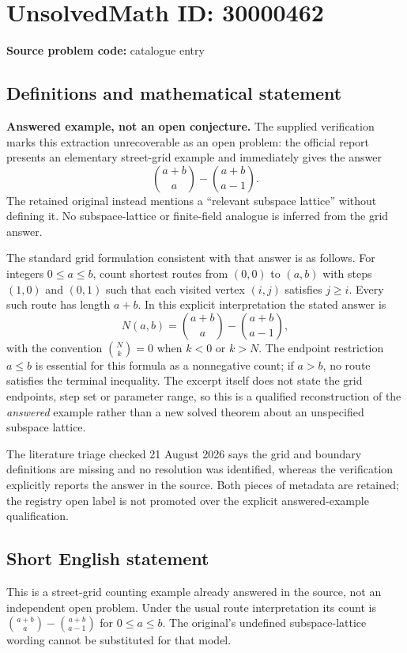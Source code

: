 \documentclass[11pt]{article}
\begin{document}
\section*{UnsolvedMath ID: 30000462}
\textbf{Source problem code:} catalogue entry
\subsection{Definitions and mathematical statement}
\textbf{Answered example, not an open conjecture.} The supplied verification marks this extraction unrecoverable as an open problem: the official report presents an elementary street-grid example and immediately gives the answer
\[
 \binom{a+b}{a}-\binom{a+b}{a-1}.
\]
The retained original instead mentions a ``relevant subspace lattice'' without defining it. No subspace-lattice or finite-field analogue is inferred from the grid answer.

The standard grid formulation consistent with that answer is as follows. For integers $0\leq a\leq b$, count shortest routes from $(0,0)$ to $(a,b)$ with steps $(1,0)$ and $(0,1)$ such that each visited vertex $(i,j)$ satisfies $j\geq i$. Every such route has length $a+b$. In this explicit interpretation the stated answer is
\[
 N(a,b)=\binom{a+b}{a}-\binom{a+b}{a-1},
\]
with the convention $\binom Nk=0$ when $k<0$ or $k>N$. The endpoint restriction $a\leq b$ is essential for this formula as a nonnegative count; if $a>b$, no route satisfies the terminal inequality. The excerpt itself does not state the grid endpoints, step set or parameter range, so this is a qualified reconstruction of the \emph{answered} example rather than a new solved theorem about an unspecified subspace lattice.

The literature triage checked 21 August 2026 says the grid and boundary definitions are missing and no resolution was identified, whereas the verification explicitly reports the answer in the source. Both pieces of metadata are retained; the registry open label is not promoted over the explicit answered-example qualification.
\subsection{Short English statement}
This is a street-grid counting example already answered in the source, not an independent open problem. Under the usual route interpretation its count is $\binom{a+b}{a}-\binom{a+b}{a-1}$ for $0\leq a\leq b$. The original's undefined subspace-lattice wording cannot be substituted for that model.
\end{document}
